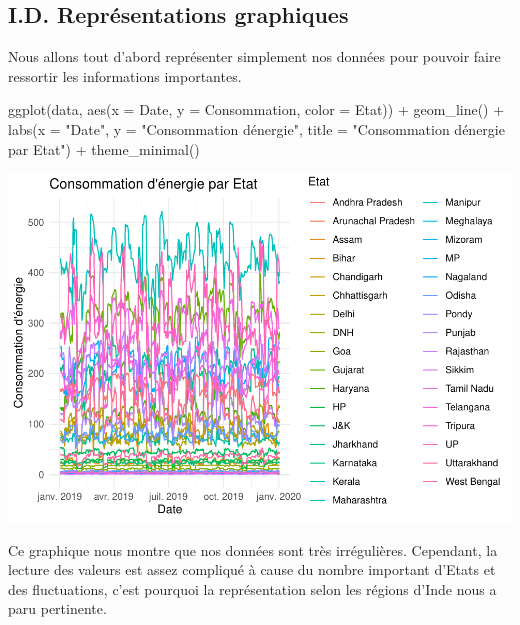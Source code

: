 \documentclass[
]{article}
\newenvironment{Shaded}{\begin{snugshade}}{\end{snugshade}}
\newcommand{\AttributeTok}[1]{\textcolor[rgb]{0.77,0.63,0.00}{#1}}
\newcommand{\FunctionTok}[1]{\textcolor[rgb]{0.00,0.00,0.00}{#1}}
\newcommand{\NormalTok}[1]{#1}
\newcommand{\SpecialCharTok}[1]{\textcolor[rgb]{0.00,0.00,0.00}{#1}}
\newcommand{\StringTok}[1]{\textcolor[rgb]{0.31,0.60,0.02}{#1}}
\begin{document}
\hypertarget{i.d.-repruxe9sentations-graphiques}{%
\subsection{I.D. Représentations
graphiques}\label{i.d.-repruxe9sentations-graphiques}}

Nous allons tout d'abord représenter simplement nos données pour pouvoir
faire ressortir les informations importantes.

\begin{Shaded}
\begin{Highlighting}[]
\FunctionTok{ggplot}\NormalTok{(data, }\FunctionTok{aes}\NormalTok{(}\AttributeTok{x =}\NormalTok{ Date, }\AttributeTok{y =}\NormalTok{ Consommation, }\AttributeTok{color =}\NormalTok{ Etat)) }\SpecialCharTok{+}
  \FunctionTok{geom\_line}\NormalTok{() }\SpecialCharTok{+}
  \FunctionTok{labs}\NormalTok{(}\AttributeTok{x =} \StringTok{"Date"}\NormalTok{, }\AttributeTok{y =} \StringTok{"Consommation d\textquotesingle{}énergie"}\NormalTok{, }
       \AttributeTok{title =} \StringTok{"Consommation d\textquotesingle{}énergie par Etat"}\NormalTok{) }\SpecialCharTok{+}
  \FunctionTok{theme\_minimal}\NormalTok{()}
\end{Highlighting}
\end{Shaded}

\includegraphics{Projet_CHESNAIS_GUIBERT_files/figure-latex/unnamed-chunk-9-1.pdf}

Ce graphique nous montre que nos données sont très irrégulières.
Cependant, la lecture des valeurs est assez compliqué à cause du nombre
important d'Etats et des fluctuations, c'est pourquoi la représentation
selon les régions d'Inde nous a paru pertinente.\\
\end{document}
